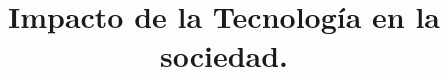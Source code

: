 \documentclass{bmcart}
\begin{document}
\begin{frontmatter}

\begin{fmbox}


\title{Impacto de la Tecnología en la sociedad.}


\author[
   addressref={aff1},                   %
   corref={aff1},                       %
   email={raul.salcido@tectijuana.edu.mx}   %
]{ }


\address[id=aff1]{%
  , %
  ,                     %
  ,                              %
}



\end{fmbox}
\end{frontmatter}
\end{document}
